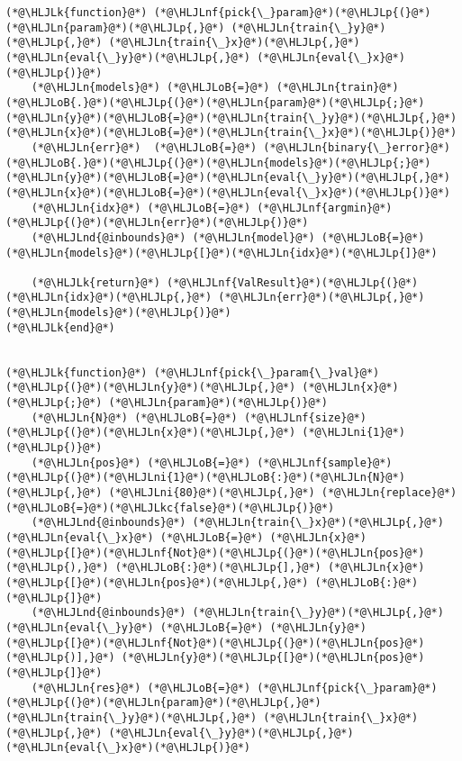 \documentclass[12pt,a4paper]{article}
\newcommand{\HLJLk}[1]{\textcolor[RGB]{148,91,176}{\textbf{#1}}}
\newcommand{\HLJLkc}[1]{\textcolor[RGB]{59,151,46}{\textit{#1}}}
\newcommand{\HLJLn}[1]{#1}
\newcommand{\HLJLnd}[1]{\textcolor[RGB]{214,102,97}{#1}}
\newcommand{\HLJLnf}[1]{\textcolor[RGB]{66,102,213}{#1}}
\newcommand{\HLJLni}[1]{\textcolor[RGB]{59,151,46}{#1}}
\newcommand{\HLJLoB}[1]{\textcolor[RGB]{102,102,102}{\textbf{#1}}}
\newcommand{\HLJLp}[1]{#1}
\begin{document}
\begin{lstlisting}
(*@\HLJLk{function}@*) (*@\HLJLnf{pick{\_}param}@*)(*@\HLJLp{(}@*)(*@\HLJLn{param}@*)(*@\HLJLp{,}@*) (*@\HLJLn{train{\_}y}@*)(*@\HLJLp{,}@*) (*@\HLJLn{train{\_}x}@*)(*@\HLJLp{,}@*) (*@\HLJLn{eval{\_}y}@*)(*@\HLJLp{,}@*) (*@\HLJLn{eval{\_}x}@*)(*@\HLJLp{)}@*)
    (*@\HLJLn{models}@*) (*@\HLJLoB{=}@*) (*@\HLJLn{train}@*)(*@\HLJLoB{.}@*)(*@\HLJLp{(}@*)(*@\HLJLn{param}@*)(*@\HLJLp{;}@*) (*@\HLJLn{y}@*)(*@\HLJLoB{=}@*)(*@\HLJLn{train{\_}y}@*)(*@\HLJLp{,}@*) (*@\HLJLn{x}@*)(*@\HLJLoB{=}@*)(*@\HLJLn{train{\_}x}@*)(*@\HLJLp{)}@*)
    (*@\HLJLn{err}@*)  (*@\HLJLoB{=}@*) (*@\HLJLn{binary{\_}error}@*)(*@\HLJLoB{.}@*)(*@\HLJLp{(}@*)(*@\HLJLn{models}@*)(*@\HLJLp{;}@*) (*@\HLJLn{y}@*)(*@\HLJLoB{=}@*)(*@\HLJLn{eval{\_}y}@*)(*@\HLJLp{,}@*) (*@\HLJLn{x}@*)(*@\HLJLoB{=}@*)(*@\HLJLn{eval{\_}x}@*)(*@\HLJLp{)}@*)
    (*@\HLJLn{idx}@*) (*@\HLJLoB{=}@*) (*@\HLJLnf{argmin}@*)(*@\HLJLp{(}@*)(*@\HLJLn{err}@*)(*@\HLJLp{)}@*)
    (*@\HLJLnd{@inbounds}@*) (*@\HLJLn{model}@*) (*@\HLJLoB{=}@*) (*@\HLJLn{models}@*)(*@\HLJLp{[}@*)(*@\HLJLn{idx}@*)(*@\HLJLp{]}@*)

    (*@\HLJLk{return}@*) (*@\HLJLnf{ValResult}@*)(*@\HLJLp{(}@*)(*@\HLJLn{idx}@*)(*@\HLJLp{,}@*) (*@\HLJLn{err}@*)(*@\HLJLp{,}@*) (*@\HLJLn{models}@*)(*@\HLJLp{)}@*)
(*@\HLJLk{end}@*)


(*@\HLJLk{function}@*) (*@\HLJLnf{pick{\_}param{\_}val}@*)(*@\HLJLp{(}@*)(*@\HLJLn{y}@*)(*@\HLJLp{,}@*) (*@\HLJLn{x}@*)(*@\HLJLp{;}@*) (*@\HLJLn{param}@*)(*@\HLJLp{)}@*)
    (*@\HLJLn{N}@*) (*@\HLJLoB{=}@*) (*@\HLJLnf{size}@*)(*@\HLJLp{(}@*)(*@\HLJLn{x}@*)(*@\HLJLp{,}@*) (*@\HLJLni{1}@*)(*@\HLJLp{)}@*)
    (*@\HLJLn{pos}@*) (*@\HLJLoB{=}@*) (*@\HLJLnf{sample}@*)(*@\HLJLp{(}@*)(*@\HLJLni{1}@*)(*@\HLJLoB{:}@*)(*@\HLJLn{N}@*)(*@\HLJLp{,}@*) (*@\HLJLni{80}@*)(*@\HLJLp{,}@*) (*@\HLJLn{replace}@*)(*@\HLJLoB{=}@*)(*@\HLJLkc{false}@*)(*@\HLJLp{)}@*)
    (*@\HLJLnd{@inbounds}@*) (*@\HLJLn{train{\_}x}@*)(*@\HLJLp{,}@*) (*@\HLJLn{eval{\_}x}@*) (*@\HLJLoB{=}@*) (*@\HLJLn{x}@*)(*@\HLJLp{[}@*)(*@\HLJLnf{Not}@*)(*@\HLJLp{(}@*)(*@\HLJLn{pos}@*)(*@\HLJLp{),}@*) (*@\HLJLoB{:}@*)(*@\HLJLp{],}@*) (*@\HLJLn{x}@*)(*@\HLJLp{[}@*)(*@\HLJLn{pos}@*)(*@\HLJLp{,}@*) (*@\HLJLoB{:}@*)(*@\HLJLp{]}@*)
    (*@\HLJLnd{@inbounds}@*) (*@\HLJLn{train{\_}y}@*)(*@\HLJLp{,}@*) (*@\HLJLn{eval{\_}y}@*) (*@\HLJLoB{=}@*) (*@\HLJLn{y}@*)(*@\HLJLp{[}@*)(*@\HLJLnf{Not}@*)(*@\HLJLp{(}@*)(*@\HLJLn{pos}@*)(*@\HLJLp{)],}@*) (*@\HLJLn{y}@*)(*@\HLJLp{[}@*)(*@\HLJLn{pos}@*)(*@\HLJLp{]}@*)
    (*@\HLJLn{res}@*) (*@\HLJLoB{=}@*) (*@\HLJLnf{pick{\_}param}@*)(*@\HLJLp{(}@*)(*@\HLJLn{param}@*)(*@\HLJLp{,}@*) (*@\HLJLn{train{\_}y}@*)(*@\HLJLp{,}@*) (*@\HLJLn{train{\_}x}@*)(*@\HLJLp{,}@*) (*@\HLJLn{eval{\_}y}@*)(*@\HLJLp{,}@*) (*@\HLJLn{eval{\_}x}@*)(*@\HLJLp{)}@*)


\end{lstlisting}
\end{document}
